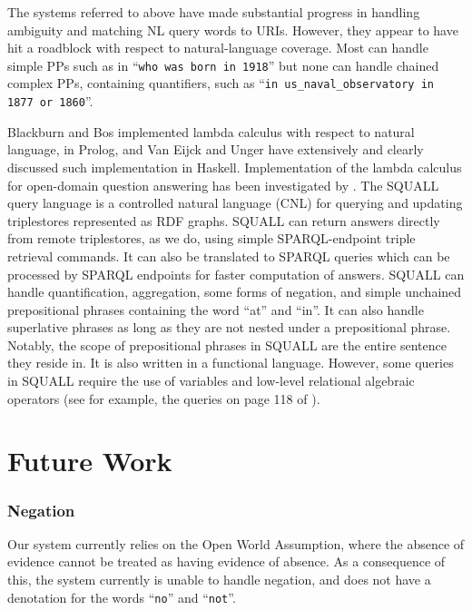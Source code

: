 \documentclass[../main.tex]{subfiles}
\begin{document}
\begin{refsection}
The systems referred to above have made substantial progress in handling ambiguity and matching NL query words to URIs. However, they appear to have hit a roadblock with respect to natural-language coverage. Most can handle simple PPs such as in ``\texttt{who was born in 1918}'' but none can handle chained complex PPs, containing quantifiers, such as ``\texttt{in us\_naval\_observatory in 1877 or 1860}''.

Blackburn and Bos \cite{blackburn2005representation} implemented lambda calculus with respect to natural language, in
Prolog, and Van Eijck and Unger \cite{van2010computational} have extensively and clearly discussed such implementation in
Haskell. Implementation of the lambda calculus for open-domain question answering has been
investigated by \cite{ahn2005question}.
The SQUALL query language \cite{ferre:squall,ferre2013squall} is a controlled natural language
(CNL) for querying and updating triplestores represented as RDF graphs. SQUALL can return
answers directly from remote triplestores, as we do, using simple SPARQL-endpoint triple
retrieval commands. It can also be translated to SPARQL queries which can be processed by
SPARQL endpoints for faster computation of answers. SQUALL can handle
quantification, aggregation, some forms of negation, and simple unchained prepositional phrases containing the word ``at'' and ``in''.  It can also handle superlative phrases as long as they are not nested under a prepositional phrase.  Notably, the scope of prepositional phrases in SQUALL are the entire sentence they reside in.
It is also written in a functional language. However, some queries in SQUALL require the use of variables and low-level relational algebraic operators (see for example, the queries on page 118
of \cite{ferre2013squall}).


\section{Future Work}
\label{webist2019journal:futurework}

\subsubsection{Negation}
Our system currently relies on the Open World Assumption, where the absence of evidence cannot be treated as having evidence of absence.  As a consequence of this, the system currently is unable to handle negation, and does not have a denotation for the words ``\texttt{no}'' and ``\texttt{not}''.


\end{refsection}
\end{document}
